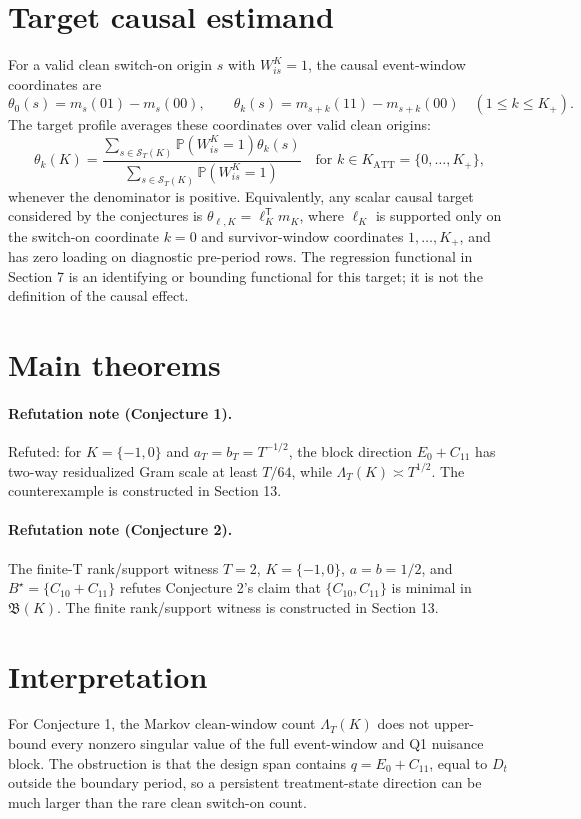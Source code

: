 \documentclass[11pt]{article}
\renewcommand{\Pr}{\mathbb{P}}
\newcommand{\transpose}{\mathsf{T}}
\theoremstyle{definition}
\theoremstyle{plain}
\theoremstyle{remark}
\begin{document}
\section{Target causal estimand}
For a valid clean switch-on origin \(s\) with \(W_{is}^K=1\), the causal event-window coordinates are
\[
\theta_0(s)=m_s(01)-m_s(00),
\qquad
\theta_k(s)=m_{s+k}(11)-m_{s+k}(00)\quad(1\le k\le K_+).
\]
The target profile averages these coordinates over valid clean origins:
\[
\theta_k(K)=
\frac{\sum_{s\in\mathcal S_T(K)}\Pr(W_{is}^K=1)\theta_k(s)}
{\sum_{s\in\mathcal S_T(K)}\Pr(W_{is}^K=1)}
\quad\text{for }k\in K_{\mathrm{ATT}}=\{0,\ldots,K_+\},
\]
whenever the denominator is positive.
Equivalently, any scalar causal target considered by the conjectures is \(\theta_{\ell,K}=\ell_K^\transpose m_K\), where \(\ell_K\) is supported only on the switch-on coordinate \(k=0\) and survivor-window coordinates \(1,\ldots,K_+\), and has zero loading on diagnostic pre-period rows.
The regression functional in Section 7 is an identifying or bounding functional for this target; it is not the definition of the causal effect.

\section{Main theorems}
\paragraph{Refutation note (Conjecture 1).}
Refuted: for \(K=\{-1,0\}\) and \(a_T=b_T=T^{-1/2}\), the block direction \(E_0+C_{11}\) has two-way residualized Gram scale at least \(T/64\), while \(\Lambda_T(K)\asymp T^{1/2}\).
The counterexample is constructed in Section 13.

\paragraph{Refutation note (Conjecture 2).}
The finite-T rank/support witness \(T=2\), \(K=\{-1,0\}\), \(a=b=1/2\), and \(B^\star=\{C_{10}+C_{11}\}\) refutes Conjecture 2's claim that \(\{C_{10},C_{11}\}\) is minimal in \(\mathfrak B(K)\).
The finite rank/support witness is constructed in Section 13.

\section{Interpretation}
For Conjecture 1, the Markov clean-window count \(\Lambda_T(K)\) does not upper-bound every nonzero singular value of the full event-window and Q1 nuisance block.
The obstruction is that the design span contains \(q=E_0+C_{11}\), equal to \(D_t\) outside the boundary period, so a persistent treatment-state direction can be much larger than the rare clean switch-on count.
\end{document}
